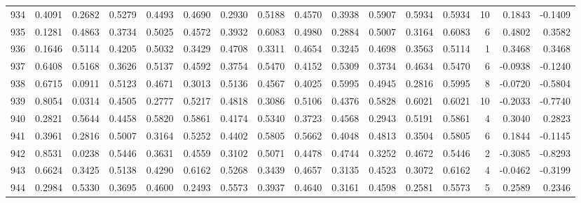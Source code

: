 \begin{tabular}{lrrrrrrrrrrrrrrr}
934 &      0.4091 &  0.2682 &  0.5279 &  0.4493 &  0.4690 &  0.2930 &  0.5188 &  0.4570 &  0.3938 &  0.5907 &   0.5934 &     0.5934 &     10 &                    0.1843 &                    -0.1409 \\
935 &      0.1281 &  0.4863 &  0.3734 &  0.5025 &  0.4572 &  0.3932 &  0.6083 &  0.4980 &  0.2884 &  0.5007 &   0.3164 &     0.6083 &      6 &                    0.4802 &                     0.3582 \\
936 &      0.1646 &  0.5114 &  0.4205 &  0.5032 &  0.3429 &  0.4708 &  0.3311 &  0.4654 &  0.3245 &  0.4698 &   0.3563 &     0.5114 &      1 &                    0.3468 &                     0.3468 \\
937 &      0.6408 &  0.5168 &  0.3626 &  0.5137 &  0.4592 &  0.3754 &  0.5470 &  0.4152 &  0.5309 &  0.3734 &   0.4634 &     0.5470 &      6 &                   -0.0938 &                    -0.1240 \\
938 &      0.6715 &  0.0911 &  0.5123 &  0.4671 &  0.3013 &  0.5136 &  0.4567 &  0.4025 &  0.5995 &  0.4945 &   0.2816 &     0.5995 &      8 &                   -0.0720 &                    -0.5804 \\
939 &      0.8054 &  0.0314 &  0.4505 &  0.2777 &  0.5217 &  0.4818 &  0.3086 &  0.5106 &  0.4376 &  0.5828 &   0.6021 &     0.6021 &     10 &                   -0.2033 &                    -0.7740 \\
940 &      0.2821 &  0.5644 &  0.4458 &  0.5820 &  0.5861 &  0.4174 &  0.5340 &  0.3723 &  0.4568 &  0.2943 &   0.5191 &     0.5861 &      4 &                    0.3040 &                     0.2823 \\
941 &      0.3961 &  0.2816 &  0.5007 &  0.3164 &  0.5252 &  0.4402 &  0.5805 &  0.5662 &  0.4048 &  0.4813 &   0.3504 &     0.5805 &      6 &                    0.1844 &                    -0.1145 \\
942 &      0.8531 &  0.0238 &  0.5446 &  0.3631 &  0.4559 &  0.3102 &  0.5071 &  0.4478 &  0.4744 &  0.3252 &   0.4672 &     0.5446 &      2 &                   -0.3085 &                    -0.8293 \\
943 &      0.6624 &  0.3425 &  0.5138 &  0.4290 &  0.6162 &  0.5268 &  0.3439 &  0.4657 &  0.3135 &  0.4523 &   0.3072 &     0.6162 &      4 &                   -0.0462 &                    -0.3199 \\
944 &      0.2984 &  0.5330 &  0.3695 &  0.4600 &  0.2493 &  0.5573 &  0.3937 &  0.4640 &  0.3161 &  0.4598 &   0.2581 &     0.5573 &      5 &                    0.2589 &                     0.2346 \\

\end{tabular}
